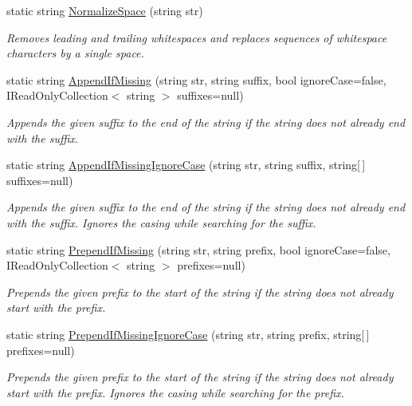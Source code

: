 \begin{DoxyCompactItemize}
static string \hyperlink{class_ultimate_1_1_utilities_1_1_string_utils_a16174740567835f1fa8c78c07287e462}{Normalize\+Space} (string str)
\begin{DoxyCompactList}\small\item\em Removes leading and trailing whitespaces and replaces sequences of whitespace characters by a single space. \end{DoxyCompactList}\item 
static string \hyperlink{class_ultimate_1_1_utilities_1_1_string_utils_aed451312442b458f5fd5a41eec76d2d0}{Append\+If\+Missing} (string str, string suffix, bool ignore\+Case=false, I\+Read\+Only\+Collection$<$ string $>$ suffixes=null)
\begin{DoxyCompactList}\small\item\em Appends the given suffix to the end of the string if the string does not already end with the suffix. \end{DoxyCompactList}\item 
static string \hyperlink{class_ultimate_1_1_utilities_1_1_string_utils_ac348fbb0096f91329675bdada6d76a6b}{Append\+If\+Missing\+Ignore\+Case} (string str, string suffix, string\mbox{[}$\,$\mbox{]} suffixes=null)
\begin{DoxyCompactList}\small\item\em Appends the given suffix to the end of the string if the string does not already end with the suffix. Ignores the casing while searching for the suffix. \end{DoxyCompactList}\item 
static string \hyperlink{class_ultimate_1_1_utilities_1_1_string_utils_a0431fe5c4ada5c40fc0be3a64c6c3640}{Prepend\+If\+Missing} (string str, string prefix, bool ignore\+Case=false, I\+Read\+Only\+Collection$<$ string $>$ prefixes=null)
\begin{DoxyCompactList}\small\item\em Prepends the given prefix to the start of the string if the string does not already start with the prefix. \end{DoxyCompactList}\item 
static string \hyperlink{class_ultimate_1_1_utilities_1_1_string_utils_ab05cdd9dab72f58f40c8930b4f23d3de}{Prepend\+If\+Missing\+Ignore\+Case} (string str, string prefix, string\mbox{[}$\,$\mbox{]} prefixes=null)
\begin{DoxyCompactList}\small\item\em Prepends the given prefix to the start of the string if the string does not already start with the prefix. Ignores the casing while searching for the prefix. \end{DoxyCompactList}\item 

\end{DoxyCompactItemize}
